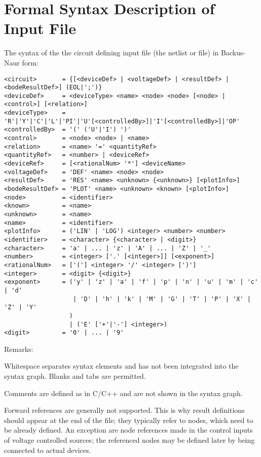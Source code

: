\chapter{Formal Syntax Description of Input File}
\label{secBNFOfCnl}

The syntax of the the circuit defining input file (the netlist or
 file) in Backus-Naur form:

\begin{small}
\begin{verbatim}
<circuit>       = {[<deviceDef> | <voltageDef> | <resultDef> | <bodeResultDef>] (EOL|';')}
<deviceDef>     = <deviceType> <name> <node> <node> [<node> | <control>] [<relation>]
<deviceType>    = 'R'|'Y'|'C'|'L'|'PI'|'U'[<controlledBy>]|'I'[<controlledBy>]|'OP'
<controlledBy>  = '(' ('U'|'I') ')'
<control>       = <node> <node> | <name>
<relation>      = <name> '=' <quantityRef>
<quantityRef>   = <number> | <deviceRef>
<deviceRef>     = [<rationalNum> '*'] <deviceName>
<voltageDef>    = 'DEF' <name> <node> <node>
<resultDef>     = 'RES' <name> <unknown> {<unknown>} [<plotInfo>]
<bodeResultDef> = 'PLOT' <name> <unknown> <known> [<plotInfo>]
<node>          = <identifier>
<known>         = <name>
<unknown>       = <name>
<name>          = <identifier>
<plotInfo>      = ('LIN' | 'LOG') <integer> <number> <number>
<identifier>    = <character> {<character> | <digit>}
<character>     = 'a' | ... | 'z' | 'A' | ... | 'Z' | '_'
<number>        = <integer> ['.' [<integer>]] [<exponent>]
<rationalNum>   = ['('] <integer> '/' <integer> [')']
<integer>       = <digit> {<digit>}
<exponent>      = ('y' | 'z' | 'a' | 'f' | 'p' | 'n' | 'u' | 'm' | 'c' | 'd'
                   | 'D' | 'h' | 'k' | 'M' | 'G' | 'T' | 'P' | 'X' | 'Z' | 'Y'
                  )
                  | ('E' ['+'|'-'] <integer>)
<digit>         = '0' | ... | '9'
\end{verbatim}
\end{small}

Remarks:

Whitespace separates syntax elements and has not been integrated into
the syntax graph. Blanks and tabs are permitted.

Comments are defined as in C/C++ and are not shown in the syntax graph.

Forward references are generally not supported. This is why result
definitions should appear at the end of the file; they typically refer to
nodes, which need to be already defined. An exception are node references
made in the control inputs of voltage controlled sources; the referenced
nodes may be defined later by being connected to actual devices.

